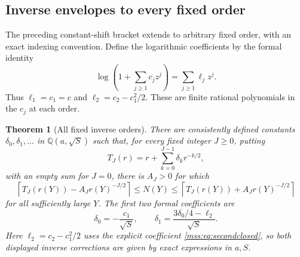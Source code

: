 \documentclass[11pt,letterpaper]{article}
\numberwithin{equation}{section}
\newtheorem{theorem}{Theorem}[section]
\theoremstyle{definition}\newtheorem{definition}[theorem]{Definition}
\theoremstyle{remark}\newtheorem{remark}[theorem]{Remark}
\begin{document}
\subsection{Inverse envelopes to every fixed order}
The preceding constant-shift bracket extends to arbitrary fixed order, with an exact indexing convention. Define the logarithmic coefficients by the formal identity
\begin{equation}\label{mss:eq:logcoeffs}
\log\left(1+\sum_{j\ge1}c_j z^j\right)=\sum_{j\ge1}\ell_jz^j.
\end{equation}
Thus $\ell_1=c_1=c$ and $\ell_2=c_2-c_1^2/2$. These are finite rational polynomials in the $c_j$ at each order.

\begin{theorem}[All fixed inverse orders]\label{mss:thm:inverseall}
There are consistently defined constants $\delta_0,\delta_1,\ldots$ in $\mathbb Q(a,\sqrt S)$ such that, for every fixed integer $J\ge0$, putting
\begin{equation}\label{mss:eq:TJ}
T_J(r)=r+\sum_{k=0}^{J-1}\delta_k r^{-k/2},
\end{equation}
with an empty sum for $J=0$, there is $A_J>0$ for which
\begin{equation}\label{mss:eq:inverseall}
\left\lceil T_J(r(Y))-A_Jr(Y)^{-J/2}\right\rceil
\le N(Y)\le
\left\lceil T_J(r(Y))+A_Jr(Y)^{-J/2}\right\rceil
\end{equation}
for all sufficiently large $Y$. The first two formal coefficients are
\begin{equation}\label{mss:eq:deltas}
\delta_0=-\frac{c_1}{\sqrt S},\qquad
\delta_1=\frac{3\delta_0/4-\ell_2}{\sqrt S}.
\end{equation}
Here $\ell_2=c_2-c_1^2/2$ uses the explicit coefficient \eqref{mss:eq:secondclosed}, so both displayed inverse corrections are given by exact expressions in $a,S$.
\end{theorem}
\end{document}
